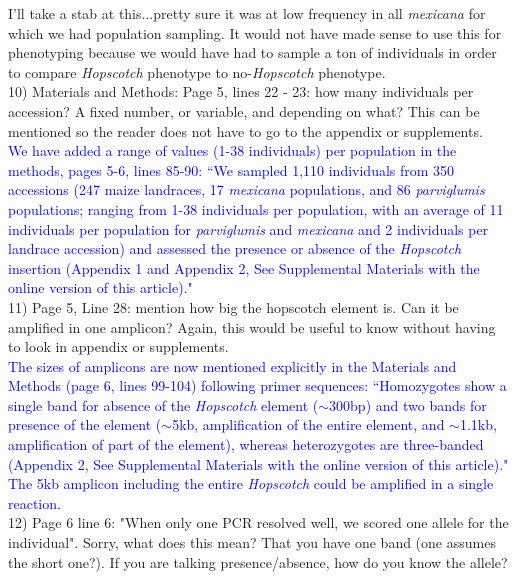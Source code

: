 \documentclass[11pt]{article}
\newcommand{\res}[1]{\noindent \textcolor{blue}{{#1}} \\}
\newcommand{\mbh}[1]{\noindent \textcolor{Dandelion}{{#1}}\\}
\begin{document}
\mbh{I'll take a stab at this...pretty sure it was at low frequency in all \emph{mexicana} for which we had population sampling.  It would not have made sense to use this for phenotyping because we would have had to sample a ton of individuals in order to compare \emph{Hopscotch} phenotype to no-\emph{Hopscotch} phenotype.}

10) Materials and Methods:
Page 5, lines 22 - 23: how many individuals per accession? A fixed number, or variable, and depending on what? This can be mentioned so the reader does not have to go to the appendix or supplements.\\ 

\res{We have added a range of values (1-38 individuals) per population in the methods, pages 5-6, lines 85-90: ``We sampled 1,110 individuals from 350 accessions (247 maize landraces, 17 \emph{mexicana} populations, and 86 \emph{parviglumis} populations; ranging from 1-38 individuals per population, with an average of 11 individuals per population for \emph{parviglumis} and \emph{mexicana} and 2 individuals per landrace accession) and assessed the presence or absence of the \emph{Hopscotch} insertion (Appendix 1 and Appendix 2, See Supplemental Materials with the online version of this article)."}


11) Page 5, Line 28: mention how big the hopscotch element is.  Can it be amplified in one amplicon? Again, this would be useful to know without having to look in appendix or supplements.\\

\res{The sizes of amplicons are now mentioned explicitly in the Materials and Methods (page 6, lines 99-104) following primer sequences: 
``Homozygotes show a single band for absence of the \emph{Hopscotch} element ($\sim$300bp) and two bands for presence of the element ($\sim$5kb, amplification of the entire element, and $\sim$1.1kb, amplification of part of the element), whereas heterozygotes are three-banded (Appendix 2, See Supplemental Materials with the online version of this article)."
The 5kb amplicon including the entire \emph{Hopscotch} could be amplified in a single reaction.}

12) Page 6 line 6: "When only one PCR resolved well, we scored one allele for the individual".  Sorry, what does this mean? That you have one band (one assumes the short one?). If you are talking presence/absence, how do you know the allele?\\ 
\end{document}
